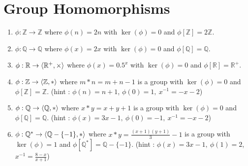 \section{Group Homomorphisms}
\begin{enumerate}
	\item $\phi : \mathbb{Z} \to \mathbb{Z}$ where $\phi(n)=2n$ with $\ker(\phi) = 0$ and $\phi[\mathbb{Z}] = 2\mathbb{Z}$.
	\item $\phi : \mathbb{Q} \to \mathbb{Q}$ where $\phi(x)=2x$ with $\ker(\phi) = 0$ and $\phi[\mathbb{Q}] = \mathbb{Q}$.
	\item $\phi : \mathbb{R} \to \left\langle \mathbb{R}^+,\times \right\rangle$ where $\phi(x)=0.5^x$ with $\ker(\phi) = 0$ and $\phi[\mathbb{R}] = \mathbb{R}^+$.
	\item $\phi : \mathbb{Z} \to \left\langle \mathbb{Z},\ast \right\rangle$ where $m \ast n = m+n-1 $ is a group with $\ker(\phi) = 0$ and $\phi[\mathbb{Z}] = \mathbb{Z}$.
		(hint : $\phi(n) = n+1$, $\phi(0) = 1,\ x^{-1} = -x-2$)
	\item $\phi : \mathbb{Q} \to \left\langle \mathbb{Q},\ast \right\rangle$ where $x \ast y =  x+y+1$ is a group with $\ker(\phi) = 0$ and $\phi[\mathbb{Q}] = \mathbb{Q}$.
		(hint : $\phi(x) = 3x-1,\ \phi(0) = -1,\ x^{-1} = -x-2$)
	\item $\phi : \mathbb{Q}^\ast \to \left\langle \mathbb{Q}-\{-1\},\ast \right\rangle$ where $x \ast y =  \frac{(x+1)(y+1)}{3}-1$ is a group with $\ker(\phi) = 1$ and $\phi[\mathbb{Q}^\ast] = \mathbb{Q}-\{-1\}$.
		(hint : $\phi(x) = 3x-1,\ \phi(1)=2$,\ $x^{-1} = \frac{8-x}{x+1}$)
\end{enumerate}

